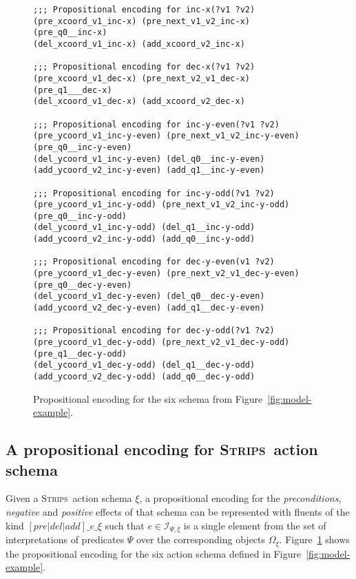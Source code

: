 \documentclass[letterpaper]{article} %
\newcommand{\strips}{\textsc{Strips}}     %
\begin{document}
\begin{figure}
\begin{tiny}
\begin{verbatim}
;;; Propositional encoding for inc-x(?v1 ?v2)
(pre_xcoord_v1_inc-x) (pre_next_v1_v2_inc-x) 
(pre_q0__inc-x)
(del_xcoord_v1_inc-x) (add_xcoord_v2_inc-x)

;;; Propositional encoding for dec-x(?v1 ?v2)
(pre_xcoord_v1_dec-x) (pre_next_v2_v1_dec-x) 
(pre_q1___dec-x)
(del_xcoord_v1_dec-x) (add_xcoord_v2_dec-x)

;;; Propositional encoding for inc-y-even(?v1 ?v2)
(pre_ycoord_v1_inc-y-even) (pre_next_v1_v2_inc-y-even)
(pre_q0__inc-y-even)
(del_ycoord_v1_inc-y-even) (del_q0__inc-y-even)
(add_ycoord_v2_inc-y-even) (add_q1__inc-y-even)

;;; Propositional encoding for inc-y-odd(?v1 ?v2)
(pre_ycoord_v1_inc-y-odd) (pre_next_v1_v2_inc-y-odd) 
(pre_q0__inc-y-odd)
(del_ycoord_v1_inc-y-odd) (del_q1__inc-y-odd)
(add_ycoord_v2_inc-y-odd) (add_q0__inc-y-odd)

;;; Propositional encoding for dec-y-even(v1 ?v2)
(pre_ycoord_v1_dec-y-even) (pre_next_v2_v1_dec-y-even)
(pre_q0__dec-y-even)
(del_ycoord_v1_dec-y-even) (del_q0__dec-y-even)
(add_ycoord_v2_dec-y-even) (add_q1__dec-y-even)

;;; Propositional encoding for dec-y-odd(?v1 ?v2)
(pre_ycoord_v1_dec-y-odd) (pre_next_v2_v1_dec-y-odd)
(pre_q1__dec-y-odd)
(del_ycoord_v1_dec-y-odd) (del_q1__dec-y-odd)
(add_ycoord_v2_dec-y-odd) (add_q0__dec-y-odd)
\end{verbatim}
\end{tiny}
 \caption{\small Propositional encoding for the six schema from Figure~\ref{fig:model-example}.}
\label{fig:encoding}
\end{figure}

\subsection{A propositional encoding for \strips\ action schema}
Given a \strips\ action schema $\xi$, a propositional encoding for the {\em preconditions}, {\em negative} and {\em positive} effects of that schema can be represented with fluents of the kind $[pre|del|add]\_e\_\xi$ such that $e\in{\mathcal I}_{\Psi,\xi}$ is a single element from the set of interpretations of predicates $\Psi$ over the corresponding objects $\Omega_\xi$. Figure~\ref{fig:encoding} shows the propositional encoding for the six action schema defined in Figure~\ref{fig:model-example}.
\end{document}

